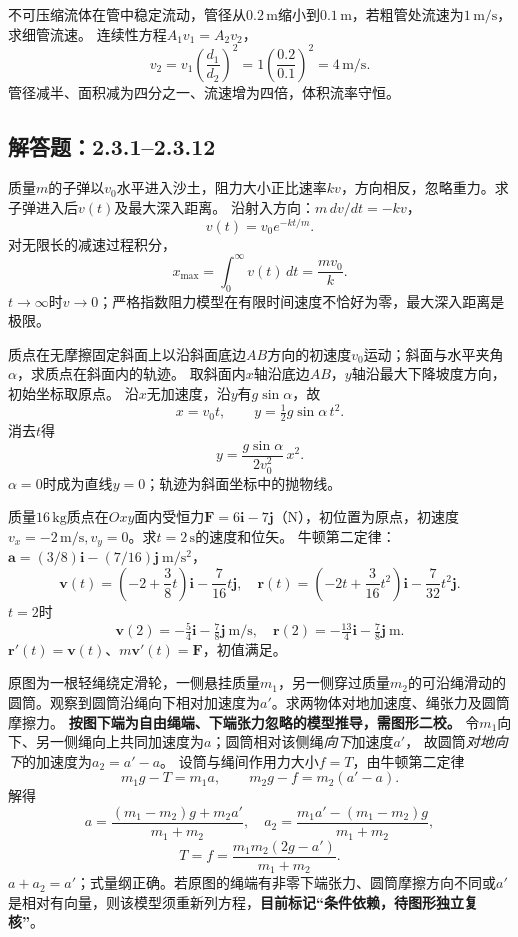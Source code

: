 \problemtext 不可压缩流体在管中稳定流动，管径从$0.2\,\mathrm m$缩小到$0.1\,\mathrm m$，若粗管处流速为$1\,\mathrm{m/s}$，求细管流速。
\workings
连续性方程$A_1v_1=A_2v_2$，
\[
\boxed{v_2=v_1\left(\frac{d_1}{d_2}\right)^2
=1\left(\frac{0.2}{0.1}\right)^2
=4\,\mathrm{m/s}}.
\]
\crosscheck 管径减半、面积减为四分之一、流速增为四倍，体积流率守恒。


\subsection{解答题：2.3.1--2.3.12}

\problemtext 质量$m$的子弹以$v_0$水平进入沙土，阻力大小正比速率$kv$，方向相反，忽略重力。求子弹进入后$v(t)$及最大深入距离。
\workings
沿射入方向：$m\,dv/dt=-kv$，
\[
\boxed{v(t)=v_0e^{-kt/m}}.
\]
对无限长的减速过程积分，
\[
\boxed{x_{\max}=\int_0^\infty v(t)\,dt=\frac{mv_0}{k}}.
\]
\crosscheck $t\to\infty$时$v\to0$；严格指数阻力模型在有限时间速度不恰好为零，最大深入距离是极限。

\problemtext 质点在无摩擦固定斜面上以沿斜面底边$AB$方向的初速度$v_0$运动；斜面与水平夹角$\alpha$，求质点在斜面内的轨迹。
\workings
取斜面内$x$轴沿底边$AB$，$y$轴沿最大下降坡度方向，初始坐标取原点。
沿$x$无加速度，沿$y$有$g\sin\alpha$，故
\[
x=v_0t,\qquad y=\tfrac12g\sin\alpha\,t^2.
\]
消去$t$得
\[
\boxed{y=\frac{g\sin\alpha}{2v_0^2}\,x^2}.
\]
\crosscheck $\alpha=0$时成为直线$y=0$；轨迹为斜面坐标中的抛物线。

\problemtext 质量$16\,\mathrm{kg}$质点在$Oxy$面内受恒力$\bm F=6\bm i-7\bm j$（N），初位置为原点，初速度$v_x=-2\,\mathrm{m/s},v_y=0$。求$t=2\,\mathrm s$的速度和位矢。
\workings
牛顿第二定律：
$\bm a=(3/8)\bm i-(7/16)\bm j\ \mathrm{m/s^2}$，
\[
\bm v(t)=\left(-2+\frac38t\right)\bm i-\frac7{16}t\bm j,
\quad
\bm r(t)=\left(-2t+\frac3{16}t^2\right)\bm i-\frac7{32}t^2\bm j.
\]
$t=2$时
\[
\boxed{\bm v(2)=-\tfrac54\bm i-\tfrac78\bm j\ \mathrm{m/s}},
\quad
\boxed{\bm r(2)=-\tfrac{13}{4}\bm i-\tfrac78\bm j\ \mathrm m}.
\]
\crosscheck $\bm r'(t)=\bm v(t)$、$m\bm v'(t)=\bm F$，初值满足。

\problemtext 原图为一根轻绳绕定滑轮，一侧悬挂质量$m_1$，另一侧穿过质量$m_2$的可沿绳滑动的圆筒。观察到圆筒沿绳向下相对加速度为$a'$。求两物体对地加速度、绳张力及圆筒摩擦力。
\workings
\textbf{按图下端为自由绳端、下端张力忽略的模型推导，需图形二校。}
令$m_1$向下、另一侧绳向上共同加速度为$a$；圆筒相对该侧绳\emph{向下}加速度$a'$，
故圆筒\emph{对地向下}的加速度为$a_2=a'-a$。
设筒与绳间作用力大小$f=T$，由牛顿第二定律
\[
m_1g-T=m_1a,\qquad m_2g-f=m_2(a'-a).
\]
解得
\[
\boxed{a=\frac{(m_1-m_2)g+m_2a'}{m_1+m_2}},\quad
\boxed{a_2=\frac{m_1a'-(m_1-m_2)g}{m_1+m_2}},
\]
\[
\boxed{T=f=\frac{m_1m_2(2g-a')}{m_1+m_2}}.
\]
\crosscheck $a+a_2=a'$；式量纲正确。若原图的绳端有非零下端张力、圆筒摩擦方向不同或$a'$是相对有向量，则该模型须重新列方程，\textbf{目前标记“条件依赖，待图形独立复核”}。

